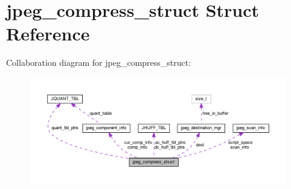 \hypertarget{structjpeg__compress__struct}{}\section{jpeg\+\_\+compress\+\_\+struct Struct Reference}
\label{structjpeg__compress__struct}


Collaboration diagram for jpeg\+\_\+compress\+\_\+struct\+:
\nopagebreak
\begin{figure}[H]
\begin{center}
\leavevmode
\includegraphics[width=350pt]{structjpeg__compress__struct__coll__graph}
\end{center}
\end{figure}
